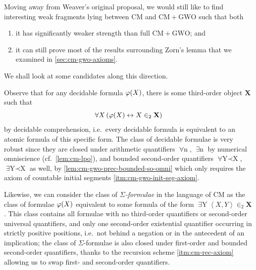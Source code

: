 \documentclass[12pt,openany]{book}
\theoremstyle{plain}
\theoremstyle{definition}
\newcommand\uplabel[1]{\textup{(#1)}}
\newcommand\tuple[1]{\left\langle #1 \right\rangle}
\newcommand\opA[1]{\mathop{\forall #1}}
\newcommand\opE[1]{\mathop{\exists #1}}
\newcommand\CM{\mathrm{CM}}
\newcommand\GWO{\mathrm{GWO}}
\begin{document}
Moving away from Weaver's original proposal, we would still like to find interesting weak fragments lying between $\CM$ and $\CM + \GWO$ such that both
\begin{enumerate}[label=\uplabel{\arabic*}]
  \item it has significantly weaker strength than full $\CM + \GWO$; and
  \item it can still prove most of the results surrounding Zorn's lemma that we examined in \autoref{sec:cm-gwo-axioms}.
\end{enumerate}
We shall look at some candidates along this direction.

Observe that for any decidable formula $\varphi\mleft(X\mright)$, there is some third-order object $\mathbf{X}$ such that
\[\opA{X} \left(\varphi\mleft(X\mright) \leftrightarrow X \in_2 \mathbf{X}\right)\]
by decidable comprehension, i.e.\ every decidable formula is equivalent to an atomic formula of this specific form. The class of decidable formulae is very robust since they are closed under arithmetic quantifiers $\opA{n}$, $\opE{n}$ by numerical omniscience (cf.\ \autoref{lem:cm-lpo}), and bounded second-order quantifiers $\opA{Y \prec X}$, $\opE{Y \prec X}$ as well, by \autoref{lem:cm-gwo-prec-bounded-so-omni} which only requires the axiom of countable initial segments \ref{itm:cm-gwo-init-seg-axiom}.

Likewise, we can consider the class of \emph{$\Sigma$-formulae} in the language of $\CM$ as the class of formulae $\varphi\mleft(X\mright)$ equivalent to some formula of the form $\opE{Y} \tuple{X, Y} \in_2 \mathbf{X}$. This class contains all formulae with no third-order quantifiers or second-order universal quantifiers, and only one second-order existential quantifier occurring in strictly positive positions, i.e.\ not behind a negation or in the antecedent of an implication; the class of $\Sigma$-formulae is also closed under first-order and bounded second-order quantifiers, thanks to the recursion scheme \ref{itm:cm-rec-axiom} allowing us to swap first- and second-order quantifiers.
\end{document}
